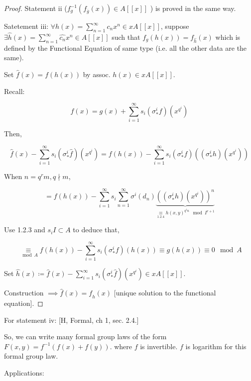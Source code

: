 \documentclass{article}
\theoremstyle{definition}
\numberwithin{theorem}{subsection}
\begin{document}
\begin{proof}
        Statement ii (\(f_g ^{-1} (f_{\overline{g}}(x)) \in A[[x]]\) ) is proved in the same way.

        Satetement iii: \(\forall h(x) = \sum_{n=1}^{\infty} c_n x^n \in x A[[x]]\), suppose \(\exists \widehat{h}(x) = \sum_{n=1}^{\infty} \widehat{c_n}x^n \in A[[x]]\) such that \(f_g(h(x)) = f_{\widehat{h}}(x)\) which is defined by the Functional Equation of same type (i.e. all the other data are the same).
        
        Set \(\widehat{f}(x) = f(h(x))\) by assoc. \(h(x) \in xA[[x]]\).

        Recall:

        \[
            f(x) = g(x) + \sum_{i=1}^{\infty} s_i(\sigma_{\ast} ^i f)(x^{q^i})
        \]

        Then,

        \[
            \widehat{f} (x) - \sum_{i=1}^{\infty} s_i (\sigma_{\ast}^i \widehat{f})(x^{q^i}) = f(h(x)) - \sum_{i = 1}^{\infty} s_i (\sigma_{\ast}^i f)((\sigma_{\ast}^i h)(x^{q^i}))
        \]

        When \(n = q^r m, q \nmid m\),

        \[
            = f(h(x)) - \sum_{i=1}^{\infty} s_i \sum_{n=1}^{\infty} \sigma^i (d_n) \underbrace{\left( (\sigma_{\ast}^i h)(x^{q^i}) \right)^n }_{\underset{1.2.4}{\equiv} h(x,y)^{q^{i} n} \mod I^{r+1}} 
        \]

        Use 1.2.3 and \(s_i I \subset A\) to deduce that,

        \[
            \underset{\mod A}{\equiv} f(h(x)) - \sum_{i=1}^{\infty} s_i (\sigma_{\ast}^i f)(h(x)) \equiv g(h(x)) \equiv 0 \mod A 
        \]

        Set \(\widehat{h}(x) \coloneqq \widehat{f}(x) - \sum_{i=1}^{\infty} s_i (\sigma_{\ast}^i \widehat{f})(x^{q^i}) \in x A[[x]]\).
        
        Construction \(\implies \widehat{f}(x) = f_{\widehat{h}}(x)\) [unique solution to the functional equation].

    \end{proof}

    For statement iv: [H, Formal, ch 1, sec. 2.4.]

    So, we can write many formal group laws of the form \(F(x,y) = f ^{-1} (f(x)+f(y))\). where \(f\) is invertible. \(f\) is logarithm for this formal group law.

    Applications:
\end{document}
